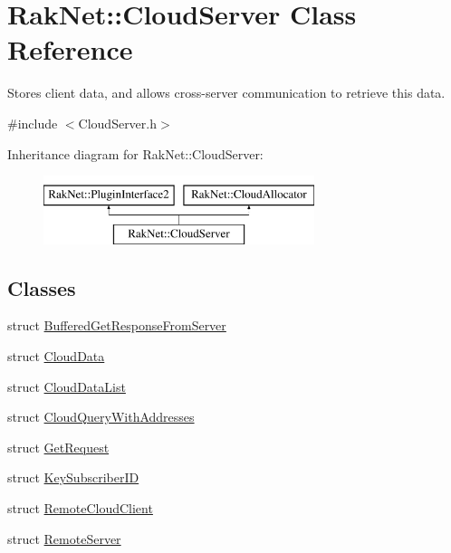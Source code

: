 \hypertarget{class_rak_net_1_1_cloud_server}{\section{Rak\-Net\-:\-:Cloud\-Server Class Reference}
\label{class_rak_net_1_1_cloud_server}
}


Stores client data, and allows cross-\/server communication to retrieve this data.  




{\ttfamily \#include $<$Cloud\-Server.\-h$>$}

Inheritance diagram for Rak\-Net\-:\-:Cloud\-Server\-:\begin{figure}[H]
\begin{center}
\leavevmode
\includegraphics[height=2.000000cm]{class_rak_net_1_1_cloud_server}
\end{center}
\end{figure}
\subsection*{Classes}
\begin{DoxyCompactItemize}
\item 
struct \hyperlink{struct_rak_net_1_1_cloud_server_1_1_buffered_get_response_from_server}{Buffered\-Get\-Response\-From\-Server}
\item 
struct \hyperlink{struct_rak_net_1_1_cloud_server_1_1_cloud_data}{Cloud\-Data}
\item 
struct \hyperlink{struct_rak_net_1_1_cloud_server_1_1_cloud_data_list}{Cloud\-Data\-List}
\item 
struct \hyperlink{struct_rak_net_1_1_cloud_server_1_1_cloud_query_with_addresses}{Cloud\-Query\-With\-Addresses}
\item 
struct \hyperlink{struct_rak_net_1_1_cloud_server_1_1_get_request}{Get\-Request}
\item 
struct \hyperlink{struct_rak_net_1_1_cloud_server_1_1_key_subscriber_i_d}{Key\-Subscriber\-I\-D}
\item 
struct \hyperlink{struct_rak_net_1_1_cloud_server_1_1_remote_cloud_client}{Remote\-Cloud\-Client}
\item 
struct \hyperlink{struct_rak_net_1_1_cloud_server_1_1_remote_server}{Remote\-Server}
\end{DoxyCompactItemize}

